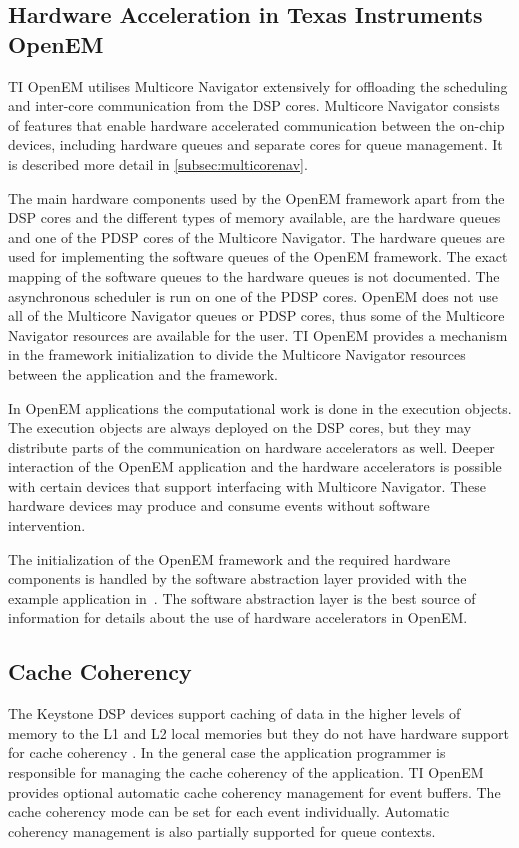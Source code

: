 \subsection{Hardware Acceleration in Texas Instruments OpenEM}
\label{subsec:ti-acceleration}
TI OpenEM utilises Multicore Navigator extensively for  offloading the scheduling and inter-core communication from the DSP cores. Multicore Navigator consists of features that enable hardware accelerated communication between the on-chip devices, including hardware queues and separate cores for queue management. It is described more detail in \ref{subsec:multicorenav}.

The main hardware components used by the OpenEM framework apart from the DSP cores and the different types of memory available, are the hardware queues and one of the PDSP cores of the Multicore Navigator. The hardware queues are used for implementing the software queues of the OpenEM framework. The exact mapping of the software queues to the hardware queues is not documented. The asynchronous scheduler is run on one of the PDSP cores. OpenEM does not use all of the Multicore Navigator queues or PDSP cores, thus some of the Multicore Navigator resources are available for the user. TI OpenEM provides a mechanism in the framework initialization to divide the Multicore Navigator resources between the application and the framework.~\cite{openemuser}

In OpenEM applications the computational work is done in the execution objects. The execution objects are always deployed on the DSP cores, but they may distribute parts of the communication on hardware accelerators as well. Deeper interaction of the OpenEM application and the hardware accelerators is possible with certain devices that support interfacing with Multicore Navigator. These hardware devices may produce and consume events without software intervention.~\cite{moerman2014open}

The initialization of the OpenEM framework and the required hardware components is handled by the software abstraction layer provided with the example application in~\cite{openemuser}. The software abstraction layer is the best source of information for details about the use of hardware accelerators in OpenEM.

\subsection{Cache Coherency}
\label{subsec:ti-cache-coherency}
The Keystone DSP devices support caching of data in the higher levels of memory to the L1 and L2 local memories but they do not have hardware support for cache coherency \cite{openemapi}. In the general case the application programmer is responsible for managing the cache coherency of the application. TI OpenEM provides optional automatic cache coherency management for event buffers. The cache coherency mode can be set for each event individually. Automatic coherency management is also partially supported for queue contexts.~\cite{moerman2014open}

